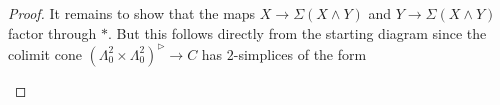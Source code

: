 \begin{lemma}
\begin{proof}
        It remains to show that the maps $X\to\Sigma\left(X\wedge Y\right)$ and $Y\to\Sigma\left(X\wedge Y\right)$ factor through $*$.
        But this follows directly from the starting diagram since the colimit cone $\left(\Lambda_0^2\times\Lambda_0^2\right)^{\rhd}\to C$ has $2$-simplices of the form
        \begin{center}
        \end{center}
    \end{proof}
\end{lemma}
